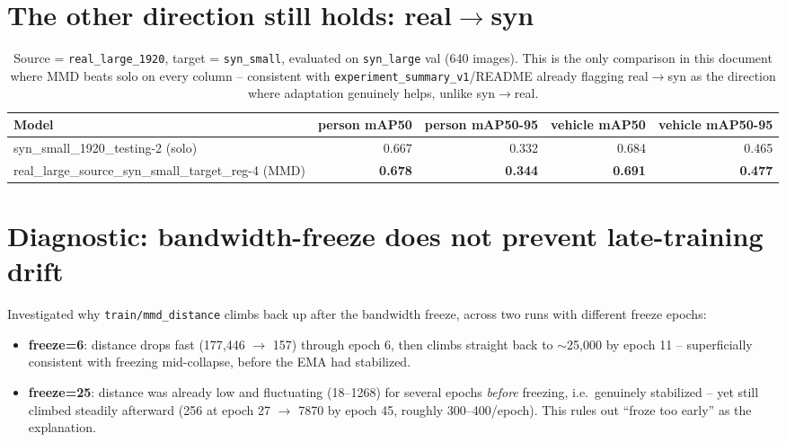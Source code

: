 \documentclass[11pt]{article}
\begin{document}
\section{The other direction still holds: real$\to$syn}

\begin{table}[h!]
    \centering
    \begin{tabular}{lrrrr}
        \toprule
        Model & person mAP50 & person mAP50-95 & vehicle mAP50 & vehicle mAP50-95 \\
        \midrule
        syn\_small\_1920\_testing-2 (solo) & 0.667 & 0.332 & 0.684 & 0.465 \\
        real\_large\_source\_syn\_small\_target\_reg-4 (MMD) & \textbf{0.678} & \textbf{0.344} & \textbf{0.691} & \textbf{0.477} \\
        \bottomrule
    \end{tabular}
    \caption{Source = \texttt{real\_large\_1920}, target = \texttt{syn\_small},
    evaluated on \texttt{syn\_large} val (640 images). This is the only comparison
    in this document where MMD beats solo on every column -- consistent with
    \texttt{experiment\_summary\_v1}/README already flagging real$\to$syn as the
    direction where adaptation genuinely helps, unlike syn$\to$real.}
\end{table}

\section{Diagnostic: bandwidth-freeze does not prevent late-training drift}

Investigated why \texttt{train/mmd\_distance} climbs back up after the bandwidth
freeze, across two runs with different freeze epochs:

\begin{itemize}
    \item \textbf{freeze=6}: distance drops fast (177{,}446 $\to$ 157) through epoch
    6, then climbs straight back to $\sim$25{,}000 by epoch 11 -- superficially
    consistent with freezing mid-collapse, before the EMA had stabilized.
    \item \textbf{freeze=25}: distance was already low and fluctuating
    (18--1268) for several epochs \emph{before} freezing, i.e.\ genuinely stabilized
    -- yet still climbed steadily afterward (256 at epoch 27 $\to$ 7870 by epoch 45,
    roughly 300--400/epoch). This rules out ``froze too early'' as the explanation.
\end{itemize}
\end{document}
